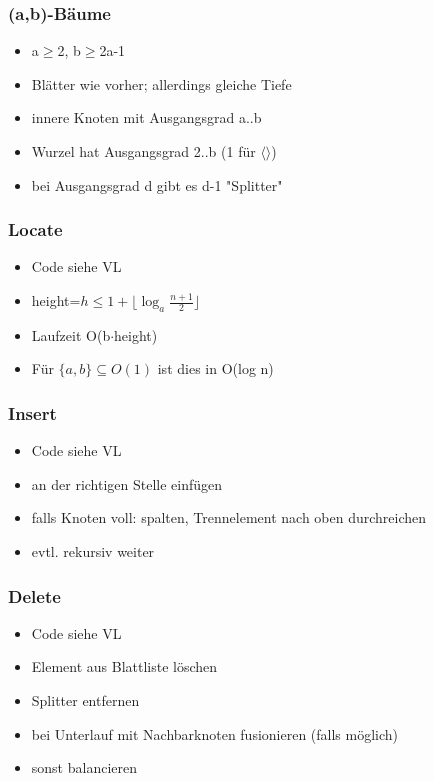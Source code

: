 \begin{frame}
\frametitle{(a,b)-Bäume}
\begin{itemize}
\item a$\geq$2, b$\geq$2a-1
\item Blätter wie vorher; allerdings gleiche Tiefe
\item innere Knoten mit Ausgangsgrad a..b
\item Wurzel hat Ausgangsgrad 2..b (1 für $\langle\rangle$)\pause
\item bei Ausgangsgrad d gibt es d-1 "Splitter"
\end{itemize}
\end{frame}

\begin{frame}
\frametitle{Locate}
\begin{itemize}
\item Code siehe VL\pause
\item height=$h\leq 1+\lfloor\log_a\frac{n+1}{2}\rfloor$
\item Laufzeit O(b$\cdot$height)
\item Für $\{a,b\}\subseteq O(1)$ ist dies in O(log n)
\end{itemize}
\end{frame}

\begin{frame}
\frametitle{Insert}
\begin{itemize}
\item Code siehe VL
\item an der richtigen Stelle einfügen\pause
\item falls Knoten voll: spalten, Trennelement nach oben durchreichen
\item evtl. rekursiv weiter
\end{itemize}
\end{frame}

\begin{frame}
\frametitle{Delete}
\begin{itemize}
\item Code siehe VL
\item Element aus Blattliste löschen
\item Splitter entfernen\pause
\item bei Unterlauf mit Nachbarknoten fusionieren (falls möglich)\pause
\item sonst balancieren
\end{itemize}
\end{frame}
